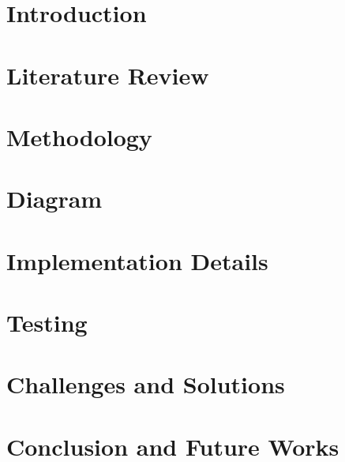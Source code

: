 \documentclass[12pt, a4paper]{report}
\begin{document}
\renewcommand{\contentsname}{Table of Contents}
\tableofcontents

\clearpage
{}
\listoffigures

\clearpage
{}
\listoftables
\clearpage


\clearpage
{}
\setcounter{page}{1}

\clearpage
\chapter{Introduction}


\clearpage
\chapter{Literature Review} \label{ch: reviews}


\clearpage
\chapter{Methodology} \label{ch: methodology}


\clearpage
\chapter{Diagram} \label{ch: diagram}


\clearpage
\chapter{Implementation Details} \label{ch: implementation}


\clearpage
\chapter{Testing} \label{ch: testing}


\clearpage
\chapter{Challenges and Solutions} \label{ch: challanges}


\clearpage
\chapter{Conclusion and Future Works} \label{ch: conclusion}



\clearpage
\renewcommand\bibname{References}


\nocite{*}
\end{document}
